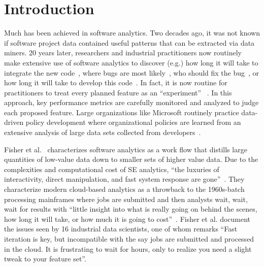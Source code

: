 \documentclass[sigconf,review, anonymous]{acmart}
\theoremstyle{break}
\begin{document}


\maketitle

% 


\section{Introduction}


Much has been achieved in software analytics. Two decades ago, it was not known if software project data contained useful patterns that can be extracted via data miners. 20 years later, researchers and industrial practitioners now routinely make extensive use of software analytics to discover (e.g.) how long it will take to integrate the new code~\cite{czerwonka2011crane}, where bugs are most likely~\cite{ostrand2004bugs}, who should fix the bug~\cite{anvik2006should}, or how long it will take to develop this code~\cite{kocaguneli2012value,kocaguneli2012exploiting,molokken2003review}. In fact, it is now routine for practitioners to treat every planned feature as an ``experiment'' ~\cite{savor2016continuous}. In this approach, key performance metrics are carefully monitored and analyzed to judge each proposed feature. Large organizations like Microsoft routinely practice data-driven policy development where organizational policies are learned from an extensive analysis of large data sets collected from developers~\cite{begel2014analyze,theisen2015approximating}.


Fisher et al.~\cite{fisher2012interactions} characterizes software analytics as a work flow that distills large quantities of low-value data down to smaller sets of higher value data. Due to the complexities and computational cost of SE analytics, ``the luxuries of interactivity, direct manipulation, and fast system response are gone''~\cite{fisher2012interactions}. They characterize modern cloud-based analytics as a throwback to the 1960s-batch processing mainframes where jobs are submitted and then analysts wait, wait, wait for results with ``little insight into what is really going on behind the scenes, how long it will take, or how much it is going to cost''~\cite{fisher2012interactions}. Fisher et al. document the issues seen by 16 industrial data scientists, one of whom remarks ``Fast iteration is key, but incompatible with the say jobs are submitted and processed in the cloud. It is frustrating to wait for hours, only to realize you need a slight tweak to your feature set''.
\end{document}
